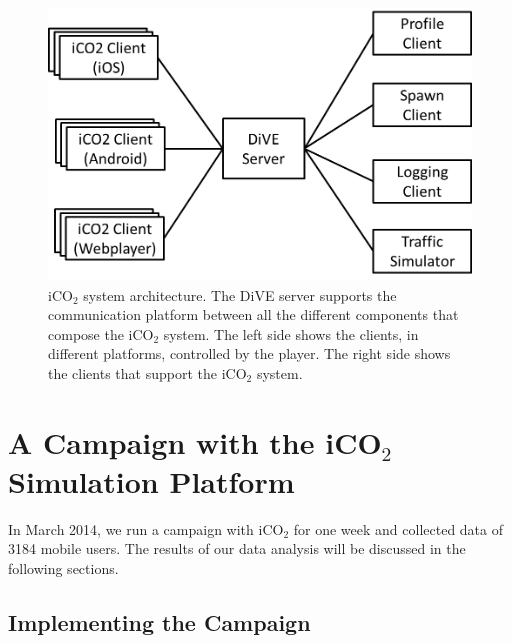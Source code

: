 \documentclass[preprint,authoryear,12pt]{elsarticle}
\begin{document}
\begin{figure}[htb]
\begin{center}
\includegraphics[width=.6\linewidth]{ijhcs14-img/iCO2_generalarchitecture}
\caption{iCO$_2$ system architecture. The DiVE server supports the communication platform between all the different components that compose the iCO$_2$ system. The left side shows the clients, in different platforms, controlled by the player. The right side shows the clients that support the iCO$_2$ system.\label{fig:iCO2_generalarchitecture}}
\end{center}
\end{figure}





\section{A Campaign with the iCO$_2$ Simulation Platform}\label{sec:campaign}


In March 2014, we run a campaign with iCO$_2$ for one week and collected data of 3184 mobile users. The results of our data analysis will be discussed in the following sections.



\subsection{Implementing the Campaign}
\label{subsec:campaign}
\end{document}
